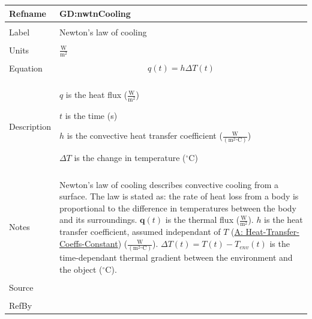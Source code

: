 \documentclass[12pt]{article}
\begin{document}
\noindent \begin{minipage}{\textwidth}
\begin{tabular}{>{\raggedright}p{}>{\raggedright\arraybackslash}p{}}
\toprule \textbf{Refname} & \textbf{GD:nwtnCooling}
\label{GD:nwtnCooling}
\\ \midrule \\
Label & Newton's law of cooling
\\ \midrule \\
Units & $\frac{\text{W}}{\text{m}^{2}}$
\\ \midrule \\
Equation & \begin{displaymath}
           q\left(t\right)=h ΔT\left(t\right)
           \end{displaymath}
\\ \midrule \\
Description & \begin{symbDescription}
              \item{$q$ is the heat flux ($\frac{\text{W}}{\text{m}^{2}}$)}
              \item{$t$ is the time (s)}
              \item{$h$ is the convective heat transfer coefficient ($\frac{\text{W}}{(\text{m}^{2}{}^{\circ}\text{C})}$)}
              \item{$ΔT$ is the change in temperature (${}^{\circ}$C)}
              \end{symbDescription}
\\ \midrule \\
Notes & Newton's law of cooling describes convective cooling from a surface. The law is stated as: the rate of heat loss from a body is proportional to the difference in temperatures between the body and its surroundings. $\mathbf{q}\left(t\right)$ is the thermal flux ($\frac{\text{W}}{\text{m}^{2}}$). $h$ is the heat transfer coefficient, assumed independant of $T$ (\hyperref[assumpHTCC]{A: Heat-Transfer-Coeffs-Constant}) ($\frac{\text{W}}{(\text{m}^{2}{}^{\circ}\text{C})}$). $ΔT\left(t\right)=T\left(t\right)-{T_{env}}\left(t\right)$ is the time-dependant thermal gradient between the environment and the object (${}^{\circ}$C).
\\ \midrule \\
Source & \cite[(pg. 8)]{incroperaEtAl2007}
\\ \midrule \\
RefBy & 
\\ \bottomrule \end{tabular}
\end{minipage}
\par~
\end{document}
